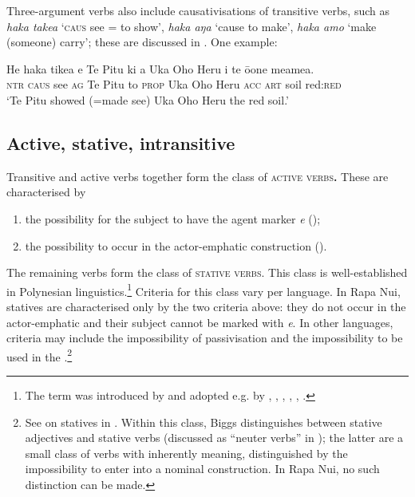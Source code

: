 Three-argument verbs also include causativisations of transitive verbs, such as \textit{haka take{\ꞌ}a} ‘\textsc{caus} see = to show’, \textit{haka aŋa} ‘cause to make’, \textit{haka {\ꞌ}amo} ‘make (someone) carry’; these are discussed in . One example:

\ea\label{ex:3.89}
\gll He haka tike{\ꞌ}a e Te Pitu ki a Uka Oho Heru i te {\ꞌ}ō{\ꞌ}one meamea.\\
\textsc{ntr} \textsc{caus} see \textsc{ag} Te Pitu to \textsc{prop} Uka Oho Heru \textsc{acc} \textsc{art} soil red:\textsc{red}\\

\glt 
‘Te Pitu showed (=made see) Uka Oho Heru the red soil.’ \textstyleExampleref{[Fel-1978.070]}
\z

\subsection{Active, stative, intransitive}\label{sec:3.4.2}
Transitive and active  verbs together form the class of \textsc{active verbs}\textbf{.} These are characterised by

\begin{enumerate}
\item 
the possibility for the subject to have the agent marker \textit{e} ();

\item 
the possibility to occur in the actor-emphatic construction ().

\end{enumerate}

The remaining verbs form the class of \textsc{stative verbs}. This class is well-established in Polynesian linguistics.\footnote{\label{fn:117}The term was introduced by \citet{Buse1965} and adopted e.g. by \citet{Hohepa1969Not}, \citet{Biggs1973}, \citet{ElbertPukui1979}, \citet{Chung1978}, \citet{Seiter1980}, \citet{MoselHovdhaugen1992}.} Criteria for this class vary per language. In Rapa Nui, statives are characterised only by the two criteria above: they do not occur in the actor-emphatic and their subject cannot be marked with \textit{e}. In other languages, criteria may include the impossibility of passivisation and the impossibility to be used in the .\footnote{\label{fn:118}See \citet{Biggs1973,Biggs1974} on statives in . Within this class, Biggs distinguishes between stative adjectives and stative verbs (discussed as “neuter verbs” in \citealt{Hooper1984Neuter}); the latter are a small class of verbs with inherently  meaning, distinguished by the impossibility to enter into a nominal construction. In Rapa Nui, no such distinction can be made.}  

